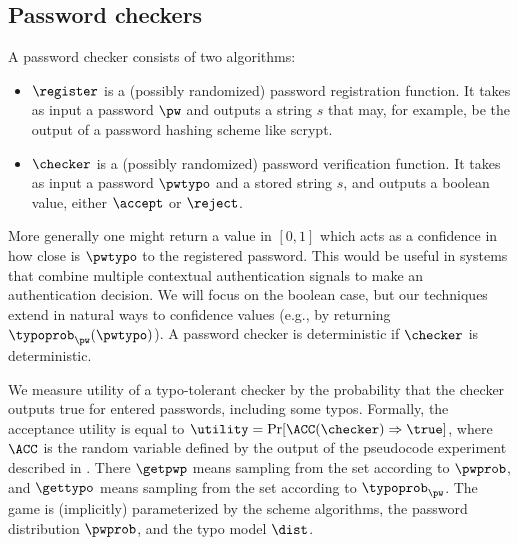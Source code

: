 \subsection{Password checkers}
A password checker consists of two algorithms:

\begin{itemize}
\item $\register$ is a (possibly randomized) password registration function. It takes as input a password $\pw$ and outputs a string $s$ that may, for example, be the output of a password hashing scheme like scrypt. 
\item $\checker$ is a (possibly randomized) password verification function. It takes as input a password $\pwtypo$ and a stored string $s$, and outputs a boolean value, either $\accept$ or $\reject$.
\end{itemize}

More generally one might return a value
in $[0,1]$ which acts as a confidence in how close is $\pwtypo$ to the
registered password. This would be useful in systems that combine multiple
contextual authentication signals to make an authentication decision. We will
focus on the boolean case, but our techniques extend in natural ways
to confidence values (e.g., by returning $\typoprob_\pw(\pwtypo)$).  A
password checker is deterministic if $\checker$ is deterministic.

We measure utility of a typo-tolerant checker by the probability that
the checker outputs true for entered passwords, including some
typos. Formally, the acceptance utility is equal to
$\utility = \Pr[\ACC(\checker)\Rightarrow \true]$, where $\ACC$ is the random
variable defined by the output of the pseudocode experiment described
in . There $\getpwp$ means sampling from the
set according to $\pwprob$, and $\gettypo$ means sampling from the set
according to $\typoprob_\pw$.  The game is (implicitly) parameterized
by the scheme algorithms, the password distribution $\pwprob$, and the
typo model $\dist$.

